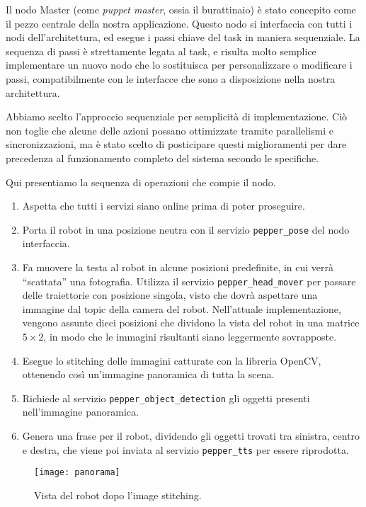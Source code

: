 Il nodo Master (come \emph{puppet master}, ossia il burattinaio) è stato concepito come il pezzo centrale della nostra applicazione. Questo nodo si interfaccia con tutti i nodi dell'architettura, ed esegue i passi chiave del task in maniera sequenziale. La sequenza di passi è strettamente legata al task, e risulta molto semplice implementare un nuovo nodo che lo sostituisca per personalizzare o modificare i passi, compatibilmente con le interfacce che sono a disposizione nella nostra architettura.

Abbiamo scelto l'approccio sequenziale per semplicità di implementazione. Ciò non toglie che alcune delle azioni possano ottimizzate tramite parallelismi e sincronizzazioni, ma è stato scelto di posticipare questi miglioramenti per dare precedenza al funzionamento completo del sistema secondo le specifiche.

Qui presentiamo la sequenza di operazioni che compie il nodo.
\begin{enumerate}
	\item Aspetta che tutti i servizi siano online prima di poter proseguire.
	\item Porta il robot in una posizione neutra con il servizio \verb|pepper_pose| del nodo interfaccia. 
	\item Fa muovere la testa al robot in alcune posizioni predefinite, in cui verrà ``scattata'' una fotografia. Utilizza il servizio \verb|pepper_head_mover| per passare delle traiettorie con posizione singola, visto che dovrà aspettare una immagine dal topic della camera del robot. Nell'attuale implementazione, vengono assunte dieci posizioni che dividono la vista del robot in una matrice $5 \times 2$, in modo che le immagini risultanti siano leggermente sovrapposte.
	\item Esegue lo stitching delle immagini catturate con la libreria OpenCV, ottenendo così un'immagine panoramica di tutta la scena.
	\item Richiede al servizio \verb|pepper_object_detection| gli oggetti presenti nell'immagine panoramica.
	\item Genera una frase per il robot, dividendo gli oggetti trovati tra sinistra, centro e destra, che viene poi inviata al servizio \verb|pepper_tts| per essere riprodotta.
\end{enumerate}

\begin{figure}
	\centering
	\texttt{[image: panorama]}
	\caption{Vista del robot dopo l'image stitching.}\label{fig:panorama}
\end{figure}

